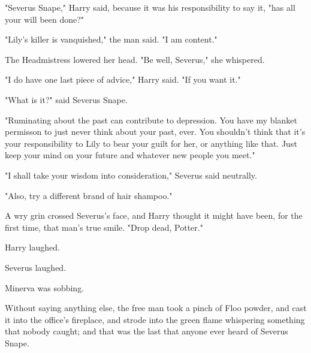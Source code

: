 "Severus Snape," Harry said, because it was his responsibility to say it, "has
all your will been done?"

"Lily's killer is vanquished," the man said. "I am content."

The Headmistress lowered her head. "Be well, Severus," she whispered.

"I do have one last piece of advice," Harry said. "If you want it."

"What is it?" said Severus Snape.

"Ruminating about the past can contribute to depression. You have my blanket
permisson to just never think about your past, ever. You shouldn't think that
it's your responsibility to Lily to bear your guilt for her, or anything like
that. Just keep your mind on your future and whatever new people you meet."

"I shall take your wisdom into consideration," Severus said neutrally.

"Also, try a different brand of hair shampoo."

A wry grin crossed Severus's face, and Harry thought it might have been, for
the first time, that man's true smile. "Drop dead, Potter."

Harry laughed.

Severus laughed.

Minerva was sobbing.

Without saying anything else, the free man took a pinch of Floo powder, and
cast it into the office's fireplace, and strode into the green flame whispering
something that nobody caught; and that was the last that anyone ever heard of
Severus Snape.
